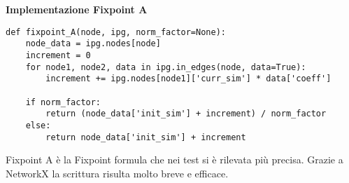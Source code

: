 \documentclass{article}
\begin{document}
\textbf{Implementazione Fixpoint A}
\begin{verbatim}
def fixpoint_A(node, ipg, norm_factor=None):
    node_data = ipg.nodes[node]
    increment = 0
    for node1, node2, data in ipg.in_edges(node, data=True):
        increment += ipg.nodes[node1]['curr_sim'] * data['coeff']

    if norm_factor:
        return (node_data['init_sim'] + increment) / norm_factor
    else:
        return node_data['init_sim'] + increment
\end{verbatim}

Fixpoint A è la Fixpoint formula che nei test si è rilevata più precisa. Grazie a NetworkX la scrittura risulta molto breve e efficace.







\end{document}
